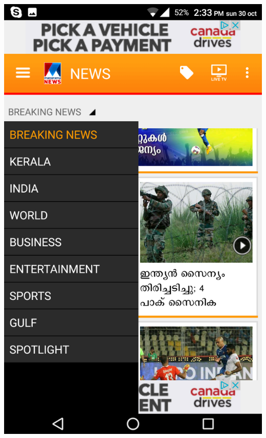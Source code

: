 \documentclass[a4paper, 11pt]{article}
\begin{document}
\includegraphics[scale=0.15]{sc.png}
\end{document}
